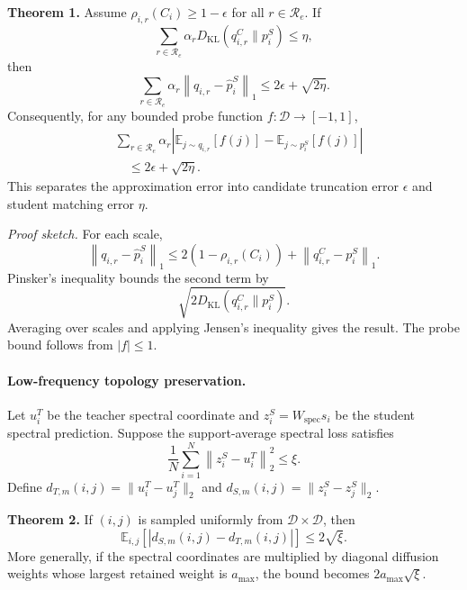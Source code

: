 \noindent\textbf{Theorem 1.}
Assume $\rho_{i,r}(C_i)\ge 1-\epsilon$ for all $r\in\mathcal{R}_e$. If
\begin{equation}
    \sum_{r\in\mathcal{R}_e}\alpha_r
    D_{\mathrm{KL}}(q_{i,r}^{C}\|p_i^S)
    \le \eta,
\end{equation}
then
\begin{equation}
    \sum_{r\in\mathcal{R}_e}\alpha_r
    \left\|q_{i,r}-\widehat p_i^S\right\|_1
    \le
    2\epsilon+\sqrt{2\eta}.
\end{equation}
Consequently, for any bounded probe function $f:\mathcal{D}\rightarrow[-1,1]$,
\begin{equation}
\begin{aligned}
&\sum_{r\in\mathcal{R}_e}\alpha_r
\left|
\mathbb{E}_{j\sim q_{i,r}}[f(j)]
-
\mathbb{E}_{j\sim p_i^S}[f(j)]
\right|\\
&\quad\le
2\epsilon+\sqrt{2\eta}.
\end{aligned}
\end{equation}
This separates the approximation error into candidate truncation error $\epsilon$ and student matching error $\eta$.

\emph{Proof sketch.}
For each scale,
\begin{equation}
    \left\|q_{i,r}-\widehat p_i^S\right\|_1
    \le
    2(1-\rho_{i,r}(C_i))
    +
    \left\|q_{i,r}^{C}-p_i^S\right\|_1.
\end{equation}
Pinsker's inequality bounds the second term by
\begin{equation}
    \sqrt{2D_{\mathrm{KL}}(q_{i,r}^{C}\|p_i^S)}.
\end{equation}
Averaging over scales and applying Jensen's inequality gives the result. The probe bound follows from $|f|\le 1$.

\paragraph{Low-frequency topology preservation.}
Let $u_i^T$ be the teacher spectral coordinate and $z_i^S=W_{\mathrm{spec}}s_i$ be the student spectral prediction. Suppose the support-average spectral loss satisfies
\begin{equation}
    \frac{1}{N}\sum_{i=1}^{N}
    \left\|z_i^S-u_i^T\right\|_2^2
    \le \xi.
\end{equation}
Define $d_{T,m}(i,j)=\|u_i^T-u_j^T\|_2$ and
$d_{S,m}(i,j)=\|z_i^S-z_j^S\|_2$.

\noindent\textbf{Theorem 2.}
If $(i,j)$ is sampled uniformly from $\mathcal{D}\times\mathcal{D}$, then
\begin{equation}
    \mathbb{E}_{i,j}
    \left[
    \left|d_{S,m}(i,j)-d_{T,m}(i,j)\right|
    \right]
    \le
    2\sqrt{\xi}.
\end{equation}
More generally, if the spectral coordinates are multiplied by diagonal diffusion weights whose largest retained weight is $a_{\max}$, the bound becomes $2a_{\max}\sqrt{\xi}$.

